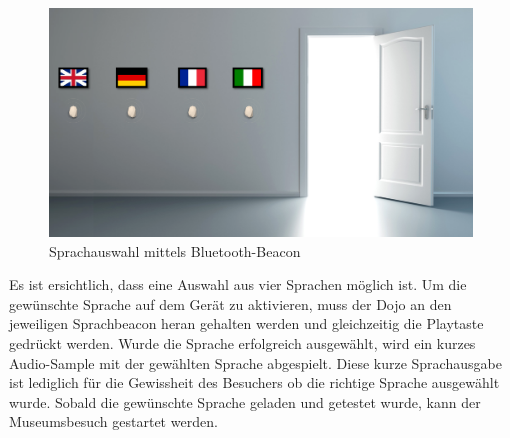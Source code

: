 \begin{figure}[H]
	\begin{center}
		\includegraphics[width=140mm]{data/BeaconSpracherkennung.png}
		\caption[Sprachauswahl mittels Bluetooth-Beacon]{Sprachauswahl mittels Bluetooth-Beacon} %
		\label{fig:SprachauswahlBeacon}
	\end{center}
\end{figure}

Es ist ersichtlich, dass eine Auswahl aus vier Sprachen möglich ist. Um die gewünschte Sprache auf dem Gerät zu aktivieren, muss der Dojo an den jeweiligen Sprachbeacon heran gehalten werden und gleichzeitig die Playtaste gedrückt werden. Wurde die Sprache erfolgreich ausgewählt, wird ein kurzes Audio-Sample mit der gewählten Sprache abgespielt. Diese kurze Sprachausgabe ist lediglich für die Gewissheit des Besuchers ob die richtige Sprache ausgewählt wurde. Sobald die gewünschte Sprache geladen und getestet wurde, kann der Museumsbesuch gestartet werden.
